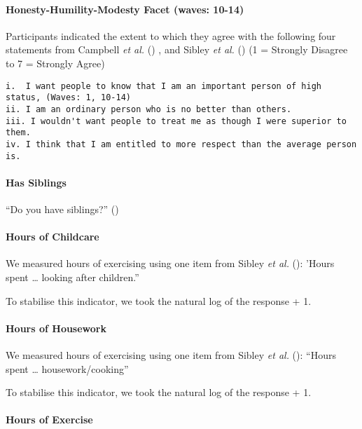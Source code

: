 \documentclass[
  singlecolumn]{article}
\let\oldparagraph\paragraph
\renewcommand{\paragraph}[1]{\oldparagraph{#1}\mbox{}}
\begin{document}
\paragraph{Honesty-Humility-Modesty Facet (waves:
10-14)}\label{honesty-humility-modesty-facet-waves-10-14}

Participants indicated the extent to which they agree with the following
four statements from Campbell \emph{et al.}
() , and Sibley \emph{et al.}
() (1 = Strongly Disagree to 7 = Strongly
Agree)

\begin{verbatim}
i.  I want people to know that I am an important person of high status, (Waves: 1, 10-14)
ii. I am an ordinary person who is no better than others.
iii. I wouldn't want people to treat me as though I were superior to them.
iv. I think that I am entitled to more respect than the average person is.
\end{verbatim}

\paragraph{Has Siblings}\label{has-siblings}

``Do you have siblings?'' ()

\paragraph{Hours of Childcare}\label{hours-of-childcare}

We measured hours of exercising using one item from Sibley \emph{et al.}
(): 'Hours spent \ldots{} looking after
children.''

To stabilise this indicator, we took the natural log of the response +
1.

\paragraph{Hours of Housework}\label{hours-of-housework}

We measured hours of exercising using one item from Sibley \emph{et al.}
(): ``Hours spent \ldots{}
housework/cooking''

To stabilise this indicator, we took the natural log of the response +
1.

\paragraph{Hours of Exercise}\label{hours-of-exercise}
\end{document}
